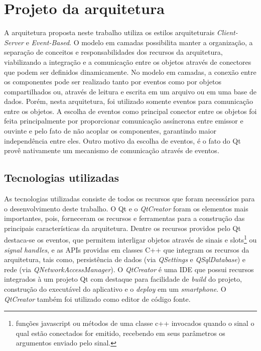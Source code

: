\section{Projeto da arquitetura}
A arquitetura proposta neste trabalho utiliza os estilos arquiteturais \textit{Client-Server} e \textit{Event-Based}. O modelo em camadas possibilita manter a organização, a separação de conceitos e responsabilidades dos recursos da arquitetura, viabilizando a integração e a comunicação entre os objetos através de conectores que podem ser definidos dinamicamente. No modelo em camadas, a conexão entre os componentes pode ser realizado tanto por eventos como por objetos compartilhados ou, através de leitura e escrita em um arquivo ou em uma base de dados. Porém, nesta arquitetura, foi utilizado somente eventos para comunicação entre os objetos. A escolha de eventos como principal conector entre os objetos foi feita principalmente por proporcionar comunicação assíncrona entre emissor e ouvinte e pelo fato de não acoplar os componentes, garantindo maior independência entre eles. Outro motivo da escolha de eventos, é o fato do Qt provê nativamente um mecanismo de comunicação através de eventos.\par


\subsection{Tecnologias utilizadas}
As tecnologias utilizadas consiste de todos os recursos que foram necessários para o desenvolvimento deste trabalho. O Qt e o \textit{QtCreator} foram os elementos mais importantes, pois, forneceram os recursos e ferramentas para a construção das principais características da arquitetura. Dentre os recursos providos pelo Qt destaca-se os eventos, que permitem interligar objetos através de sinais e slots\footnote{funções javascript ou métodos de uma classe c++ invocados quando o sinal o qual estão conectados for emitido, recebendo em seus parâmetros os argumentos enviado pelo sinal.} ou \textit{signal handles}, e as APIs providas em classes C++ que integram os recursos da arquitetura, tais como, persistência de dados (via \textit{QSettings} e \textit{QSqlDatabase}) e rede (via \textit{QNetworkAccessManager}). O \textit{QtCreator} é uma IDE que possui recursos integrados à um projeto Qt com destaque para facilidade de \textit{build} do projeto, construção do executável do aplicativo e o \textit{deploy} em um \textit{smartphone}. O \textit{QtCreator} também foi utilizado como editor de código fonte.


